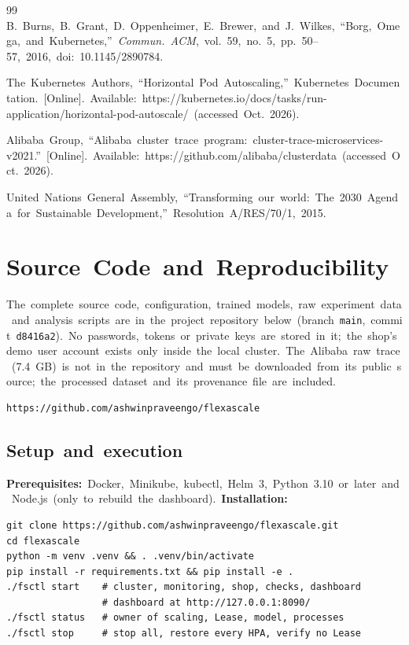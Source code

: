 \documentclass[12pt,a4paper,oneside]{report}
\begin{document}
\begin{thebibliography}{99}
B.~Burns,~B.~Grant,~D.~Oppenheimer,~E.~Brewer,~and~J.~Wilkes,~``Borg,~Omega,~and~Kubernetes,''~\textit{Commun.~ACM},~vol.~59,~no.~5,~pp.~50--57,~2016,~doi:~10.1145/2890784.

The~Kubernetes~Authors,~``Horizontal~Pod~Autoscaling,''~Kubernetes~Documentation.~[Online].~Available:~https://kubernetes.io/docs/tasks/run-application/horizontal-pod-autoscale/~(accessed~Oct.~2026).

Alibaba~Group,~``Alibaba~cluster~trace~program:~cluster-trace-microservices-v2021.''~[Online].~Available:~https://github.com/alibaba/clusterdata~(accessed~Oct.~2026).

United~Nations~General~Assembly,~``Transforming~our~world:~The~2030~Agenda~for~Sustainable~Development,''~Resolution~A/RES/70/1,~2015.
\end{thebibliography}
\clearpage
\appendix

\clearpage
\chapter{Source~Code~and~Reproducibility}\label{chap:appendix}

The~complete~source~code,~configuration,~trained~models,~raw~experiment~data~and~analysis~scripts~are~in~the~project~repository~below~(branch~\texttt{main},~commit~\texttt{d8416a2}).~No~passwords,~tokens~or~private~keys~are~stored~in~it;~the~shop's~demo~user~account~exists~only~inside~the~local~cluster.~The~Alibaba~raw~trace~(7.4~GB)~is~not~in~the~repository~and~must~be~downloaded~from~its~public~source;~the~processed~dataset~and~its~provenance~file~are~included.


\begin{verbatim}
https://github.com/ashwinpraveengo/flexascale
\end{verbatim}

\section{Setup~and~execution}

\textbf{Prerequisites:}~Docker,~Minikube,~kubectl,~Helm~3,~Python~3.10~or~later~and~Node.js~(only~to~rebuild~the~dashboard).~\textbf{Installation:}


\begin{verbatim}
git clone https://github.com/ashwinpraveengo/flexascale.git
cd flexascale
python -m venv .venv && . .venv/bin/activate
pip install -r requirements.txt && pip install -e .
./fsctl start    # cluster, monitoring, shop, checks, dashboard
                 # dashboard at http://127.0.0.1:8090/
./fsctl status   # owner of scaling, Lease, model, processes
./fsctl stop     # stop all, restore every HPA, verify no Lease
\end{verbatim}
\end{document}
